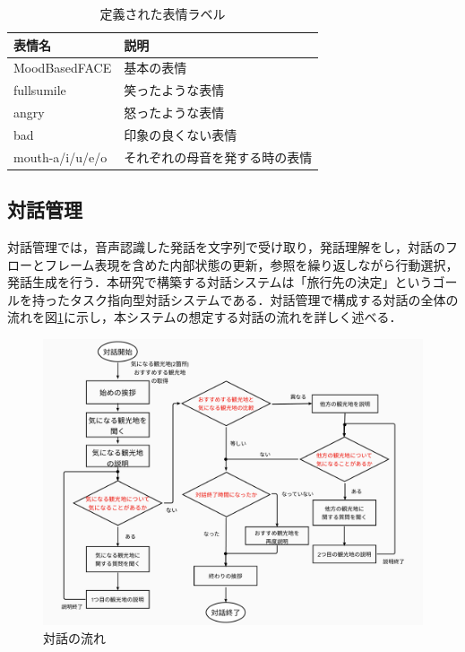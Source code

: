 \begin{table}[hbtp]
    \caption{定義された表情ラベル}
    \label{labels}
    \centering
    \begin{tabular}{l|l}
    \hline
    表情名           & 説明              \\ \hline
    MoodBasedFACE   & 基本の表情           \\
    fullsumile      & 笑ったような表情        \\
    angry           & 怒ったような表情        \\
    bad             & 印象の良くない表情       \\
    mouth-a/i/u/e/o & それぞれの母音を発する時の表情 \\ \hline
    \end{tabular}
\end{table}

\subsection{対話管理}
\label{対話管理}
対話管理では，音声認識した発話を文字列で受け取り，発話理解をし，対話のフローとフレーム表現を含めた内部状態の更新，参照を繰り返しながら行動選択，発話生成を行う．本研究で構築する対話システムは「旅行先の決定」というゴールを持ったタスク指向型対話システムである．対話管理で構成する対話の全体の流れを図\ref{flow}に示し，本システムの想定する対話の流れを詳しく述べる．

\begin{figure}[th]
    \centering
    \includegraphics[scale=0.25]{pic/flow.pdf}
    \caption{対話の流れ}
    \label{flow}
\end{figure}

